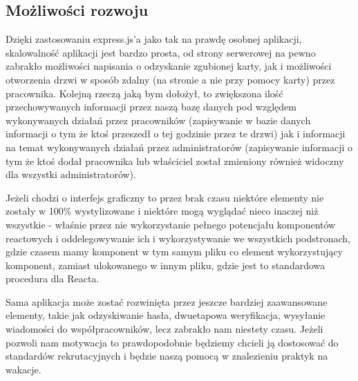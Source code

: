 \subsection{Możliwości rozwoju}

Dzięki zastosowaniu express.js'a jako tak na prawdę osobnej aplikacji, skalowalność aplikacji jest bardzo prosta, od strony serwerowej na pewno zabrakło możliwości napisania o odzyskanie zgubionej karty, jak i możliwości otworzenia drzwi w sposób zdalny (na stronie a nie przy pomocy karty) przez pracownika. Kolejną rzeczą jaką bym dołożył, to zwiększona ilość przechowywanych informacji przez naszą bazę danych pod względem wykonywanych działań przez pracowników (zapisywanie w bazie danych informacji o tym że ktoś przeszedł o tej godzinie przez te drzwi) jak i informacji na temat wykonywanych działań przez administratorów (zapisywanie informacji o tym że ktoś dodał pracownika lub właściciel został zmieniony również widoczny dla wszystki administratorów).

Jeżeli chodzi o interfejs graficzny to przez brak czasu niektóre elementy nie zostały w 100\% wystylizowane i niektóre mogą wyglądać nieco inaczej niż wszystkie - właśnie przez nie wykorzystanie pełnego potencjału komponentów reactowych i oddelegowywanie ich i wykorzystywanie we wszystkich podstronach, gdzie czasem mamy komponent w tym samym pliku co element wykorzystujący komponent, zamiast ulokowanego w innym pliku, gdzie jest to standardowa procedura dla Reacta.

Sama aplikacja może zostać rozwinięta przez jeszcze bardziej zaawansowane elementy, takie jak odzyskiwanie hasła, dwuetapowa weryfikacja, wysyłanie wiadomości do współpracowników, lecz zabrakło nam niestety czasu. Jeżeli pozwoli nam motywacja to prawdopodobnie będziemy chcieli ją dostosować do standardów rekrutacyjnych i będzie naszą pomocą w znalezieniu praktyk na wakacje.
\newpage
\listoffigures
\listoftables